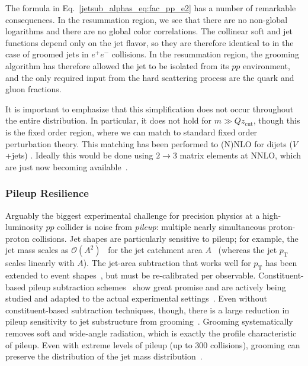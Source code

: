 \documentclass[11pt]{cernrep}
\begin{document}
The formula in Eq.~\eqref{jetsub_alphas_eq:fac_pp_e2} has a number of remarkable consequences.
%
In the resummation region, we see that there are no non-global logarithms and there are no global color correlations.
%
The collinear soft and jet functions depend only on the jet flavor, so they are therefore identical to in the case of groomed jets in $e^+e^-$ collisions.
%
In the resummation region, the grooming algorithm has therefore allowed the jet to be isolated from its $pp$ environment, and the only required input from the hard scattering process are the quark and gluon fractions. 

It is important to emphasize that this simplification does not occur throughout the entire distribution.
%
In particular, it does not hold for $m \gg Qz_{\mathrm{cut}} $, though this is the fixed order region, where we can match to standard fixed order perturbation theory.
%
This matching has been performed to (N)NLO for dijets ($V$+jets) \cite{Frye:2016aiz,Marzani:2017kqd,Marzani:2017mva}.
%
Ideally this would be done using $2\to 3$ matrix elements at NNLO, which are just now becoming available~\cite{Gehrmann:2015bfy,Dunbar:2016aux,Badger:2013yda,Badger:2017jhb,Abreu:2017hqn}.

\subsubsection{Pileup Resilience}

Arguably the biggest experimental challenge for precision physics at a high-luminosity $pp$ collider is noise from \textit{pileup}: multiple nearly simultaneous proton-proton collisions.
%
Jet shapes are particularly sensitive to pileup; for example, the jet mass scales as $\mathcal{O}(A^2)$~\cite{Salam:2009jx} for the jet catchment area $A$~\cite{Cacciari:2008gn} (whereas the jet $p_\mathrm{T}$ scales linearly with $A$).
%
The jet-area subtraction that works well for $p_\mathrm{T}$ has been extended to event shapes~\cite{Soyez:2012hv}, but must be re-calibrated per observable.
%
Constituent-based pileup subtraction schemes~\cite{Cacciari:2014gra,Krohn:2013lba,Bertolini:2014bba,Berta:2014eza,Komiske:2017ubm} show great promise and are actively being studied and adapted to the actual experimental settings~\cite{CMS-PAS-JME-14-001,CMS-DP-2015-034,ATLAS-CONF-2017-065,ATL-PHYS-PUB-2017-020,Aad:2015ina}.
%
Even without constituent-based subtraction techniques, though, there is a large reduction in pileup sensitivity to jet substructure from grooming~\cite{CMS-PAS-JME-14-001,Aad:2015rpa,Aad:2015ina,Altheimer:2013yza}.
%
Grooming systematically removes soft and wide-angle radiation, which is exactly the profile characteristic of pileup.
%
Even with extreme levels of pileup (up to 300 collisions), grooming can preserve the distribution of the jet mass distribution~\cite{JetSubstructureECFA2014}. 
\end{document}
